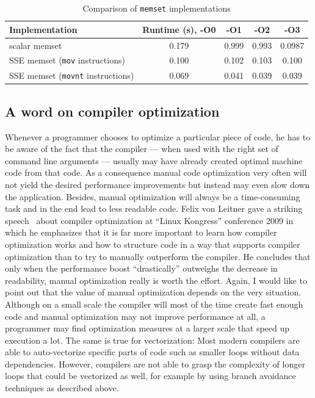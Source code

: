 \begin{table}[h]
\begin{center}
\caption{Comparison of \texttt{memset} implementations}
\begin{tabular}{lcccc}
\toprule
Implementation & Runtime (s), -O0 & -O1 & -O2 & -O3 \\
\midrule
scalar memset & 0.179 & 0.999 & 0.993 & 0.0987 \\
SSE memset (\texttt{mov} instructions) & 0.100 & 0.102 & 0.103 & 0.100 \\
SSE memset (\texttt{movnt} instructions) & 0.069 & 0.041 & 0.039 & 0.039 \\
\bottomrule
\end{tabular}
\label{memset_table}
\end{center}
\end{table}

\subsection{A word on compiler optimization}
Whenever a programmer chooses to optimize a particular piece of code, he has to be aware of the fact that the compiler --- when used with the right set of command line arguments --- usually may have already created optimal machine code from that code. As a consequence manual code optimization very often will not yield the desired performance improvements but instead may even slow down the application. Besides, manual optimization will always be a time-consuming task and in the end lead to less readable code. Felix von Leitner gave a striking speech~\cite{leitner2009} about compiler optimization at ``Linux Kongress'' conference 2009 in which he emphasizes that it is far more important to learn how compiler optimization works and how to structure code in a way that supports compiler optimization than to try to manually outperform the compiler. He concludes that only when the performance boost ``drastically'' outweighs the decrease in readability, manual optimization really is worth the effort. Again, I would like to point out that the value of manual optimization depends on the very situation. Although on a small scale the compiler will most of the time create fast enough code and manual optimization may not improve performance at all, a programmer may find optimization measures at a larger scale that speed up execution a lot. The same is true for vectorization: Most modern compilers are able to auto-vectorize specific parts of code such as smaller loops without data dependencies. However, compilers are not able to grasp the complexity of longer loops that could be vectorized as well, for example by using branch avoidance techniques as described above.